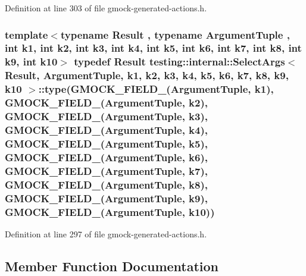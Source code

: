 Definition at line 303 of file gmock-\/generated-\/actions.\+h.

\subsubsection[{\texorpdfstring{type}{type}}]{\setlength{\rightskip}{0pt plus 5cm}template$<$typename Result , typename Argument\+Tuple , int k1, int k2, int k3, int k4, int k5, int k6, int k7, int k8, int k9, int k10$>$ typedef {\bf Result} {\bf testing\+::internal\+::\+Select\+Args}$<$ {\bf Result}, {\bf Argument\+Tuple}, k1, k2, k3, k4, k5, k6, k7, k8, k9, k10 $>$\+::type({\bf G\+M\+O\+C\+K\+\_\+\+F\+I\+E\+L\+D\+\_\+}({\bf Argument\+Tuple}, k1), {\bf G\+M\+O\+C\+K\+\_\+\+F\+I\+E\+L\+D\+\_\+}({\bf Argument\+Tuple}, k2), {\bf G\+M\+O\+C\+K\+\_\+\+F\+I\+E\+L\+D\+\_\+}({\bf Argument\+Tuple}, k3), {\bf G\+M\+O\+C\+K\+\_\+\+F\+I\+E\+L\+D\+\_\+}({\bf Argument\+Tuple}, k4), {\bf G\+M\+O\+C\+K\+\_\+\+F\+I\+E\+L\+D\+\_\+}({\bf Argument\+Tuple}, k5), {\bf G\+M\+O\+C\+K\+\_\+\+F\+I\+E\+L\+D\+\_\+}({\bf Argument\+Tuple}, k6), {\bf G\+M\+O\+C\+K\+\_\+\+F\+I\+E\+L\+D\+\_\+}({\bf Argument\+Tuple}, k7), {\bf G\+M\+O\+C\+K\+\_\+\+F\+I\+E\+L\+D\+\_\+}({\bf Argument\+Tuple}, k8), {\bf G\+M\+O\+C\+K\+\_\+\+F\+I\+E\+L\+D\+\_\+}({\bf Argument\+Tuple}, k9), {\bf G\+M\+O\+C\+K\+\_\+\+F\+I\+E\+L\+D\+\_\+}({\bf Argument\+Tuple}, k10))}\hypertarget{classtesting_1_1internal_1_1_select_args_a9e8d3a748637b91376acab2330d87749}{}\label{classtesting_1_1internal_1_1_select_args_a9e8d3a748637b91376acab2330d87749}


Definition at line 297 of file gmock-\/generated-\/actions.\+h.



\subsection{Member Function Documentation}

